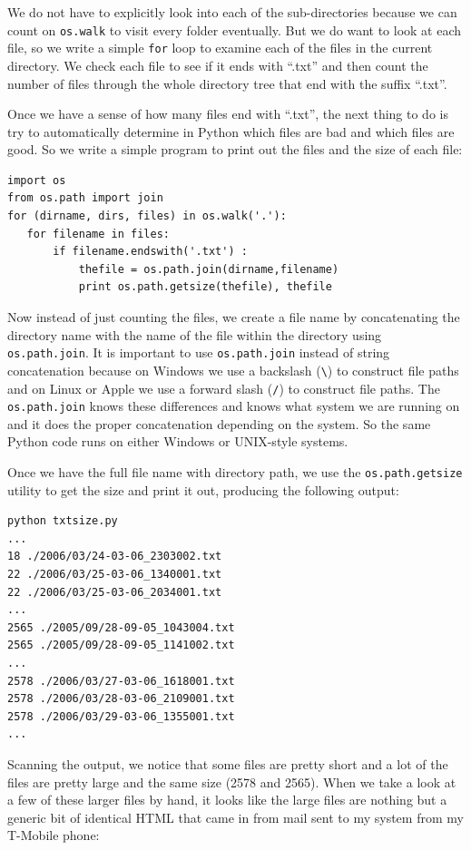 \documentclass[10pt]{book}
\begin{document}
We do not have to explicitly look into each of the sub-directories
because we can count on {\tt os.walk} to visit every 
folder eventually.  But we do want to look at each file, so 
we write a simple {\tt for} loop to examine each of the files 
in the current directory.   We check each file to see if 
it ends with ``.txt'' and then count the number of 
files through the whole directory tree that end with the
suffix ``.txt''.

Once we have a sense of how many files end with ``.txt'', the next
thing to do is try to automatically
determine in Python which files are bad and which files
are good.   So we write a simple program to print out the
files and the size of each file:

\beforeverb
\begin{verbatim}
import os
from os.path import join
for (dirname, dirs, files) in os.walk('.'):
   for filename in files:
       if filename.endswith('.txt') :
           thefile = os.path.join(dirname,filename)
           print os.path.getsize(thefile), thefile
\end{verbatim}
\afterverb
%
Now instead of just counting the files, we create 
a file name by concatenating the directory name with
the name of the file within the directory using
{\tt os.path.join}.   It is important to use 
{\tt os.path.join} instead of string concatenation 
because on Windows we use a backslash
(\verb"\") to construct file paths and on Linux
or Apple we use a forward slash (\verb"/") 
to construct file paths.  The {\tt os.path.join}
knows these differences and knows what system
we are running on and it does the proper concatenation
depending on the system.  So the same Python code
runs on either Windows or UNIX-style systems.

Once we have the full file name with directory
path, we use the {\tt os.path.getsize} utility
to get the size and print it out, producing the 
following output:

\beforeverb
\begin{verbatim}
python txtsize.py
...
18 ./2006/03/24-03-06_2303002.txt
22 ./2006/03/25-03-06_1340001.txt
22 ./2006/03/25-03-06_2034001.txt
...
2565 ./2005/09/28-09-05_1043004.txt
2565 ./2005/09/28-09-05_1141002.txt
...
2578 ./2006/03/27-03-06_1618001.txt
2578 ./2006/03/28-03-06_2109001.txt
2578 ./2006/03/29-03-06_1355001.txt
...
\end{verbatim}
\afterverb
%
Scanning the output, we notice that some files are pretty short and 
a lot of the files are pretty large and the same size (2578 and 2565). 
When we take a look at a few of these larger files by hand, 
it looks like the large 
files are nothing but a generic bit of identical HTML that came 
in from mail sent to my system from my T-Mobile phone:
\end{document}
